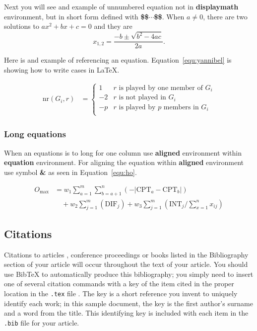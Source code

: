 \documentclass[article,english]{stucosrec}
\newcommand{\latex}{\LaTeX\xspace}
\newcommand{\bibtex}{Bib\TeX\xspace}
\begin{document}
	Next you will see and example of unnumbered equation not in \textbf{displaymath} environment, but in short form defined with \textbf{\$\$$\cdots$\$\$}.
	When $a \ne 0$, there are two solutions to $ax^2 + bx + c = 0$ and they are $$x_{1, 2} = \frac{-b \pm \sqrt{b^2-4ac}}{2a}.$$
	
	Here is and example of referencing an equation. Equation~\ref{equ:yannibel} is showing how to write cases in \latex.
	
	\begin{equation}
		\begin{aligned} 
			\mathrm{nr}(G_i,r) & = \label{equ:yannibel}
			\begin{cases}
				1  & \text{$r$ is played by one member of $G_i$}\\
				-2 & \text{$r$ is not played in $G_i$} \\
				-p & \text{$r$ is played by $p$ members in $G_i$}\\
			\end{cases}
		\end{aligned}
	\end{equation}
	
	\subsubsection{Long equations}
	
	When an equations is to long for one column use \textbf{aligned} environment within \textbf{equation} environment.
	For aligning the equation within \textbf{aligned} environment use symbol \textbf{\&} as seen in Equation~\ref{equ:ho}.
	
	\begin{equation}
		\begin{aligned}
			O_{\max}& = w_1 \sum_{a=1}^{m} \sum_{b=a+1}^{n} (-\lvert\text{CPT}_a 
			-\text{CPT}_b\rvert)\\ 
			&\quad + w_2 \sum_{j=1}^{m} (\text{DIF}_j) + w_3 \sum_{j=1}^{m} 
			(\text{INT}_j/\sum_{x=1}^{n} x_{ij})
		\end{aligned}
		\label{equ:ho}
	\end{equation}
	
	\subsection{Citations}
	
	Citations to articles \cite{lecun2015deep, bowman:reasoning, clark:pct, braams:babel, herlihy:methodology}, conference proceedings \cite{clark:pct} or books \cite{salas:calculus, Lamport:LaTeX, fister2019computational} listed
	in the Bibliography section of your article will occur throughout the text of your article.
	You should use \bibtex to automatically produce this bibliography; you simply need to insert one of several citation commands with a key of the item cited in the proper location in the \texttt{.tex} file \cite{Lamport:LaTeX}.
	The key is a short reference you invent to uniquely identify each work; in this sample document, the key is the first author's surname and a word from the title.
	This identifying key is included with each item in the \texttt{.bib} file for your article.
	
\end{document}
